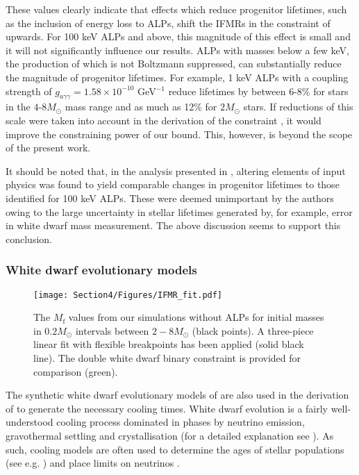 These values clearly indicate that effects which reduce progenitor lifetimes, such as the inclusion of energy loss to ALPs, shift the IFMRs in the constraint of \cite{Andrews} upwards. For 100 keV ALPs and above, this magnitude of this effect is small and it will not significantly influence our results. ALPs with masses below a few keV, the production of which is not Boltzmann suppressed, can substantially reduce the magnitude of progenitor lifetimes. For example, 1 keV ALPs with a coupling strength of $g_{a\gamma\gamma}=1.58\times10^{-10}$ GeV$^{-1}$ reduce lifetimes by between 6-8\% for stars in the $4$-$8M_{\odot}$ mass range and as much as 12\% for $2M_{\odot}$ stars. If reductions of this scale were taken into account in the derivation of the constraint \cite{Andrews}, it would improve the constraining power of our bound. This, however, is beyond the scope of the present work.


It should be noted that, in the analysis presented in \cite{Andrews}, altering elements of input physics was found to yield comparable changes in progenitor lifetimes to those identified for 100 keV ALPs. These were deemed unimportant by the authors owing to the large uncertainty in stellar lifetimes generated by, for example, error in white dwarf mass measurement. The above discussion seems to support this conclusion.


\subsubsection*{White dwarf evolutionary models}
\begin{figure}[t]
    \centering
    \texttt{[image: Section4/Figures/IFMR\_fit.pdf]}
    \caption{The $M_{\mathrm{f}}$ values from our simulations without ALPs for initial masses in $0.2M_{\odot}$ intervals between $2-8M_{\odot}$ (black points).  A three-piece linear fit with flexible breakpoints has been applied (solid black line). The double white dwarf binary constraint \cite{Andrews} is provided for comparison (green).}
    \label{fig: IFMR fit}
\end{figure}


The synthetic white dwarf evolutionary models of \cite{2001PASP..113..409F} are also used in the derivation of \cite{Andrews} to generate the necessary cooling times. White dwarf evolution is a fairly well-understood cooling process dominated in phases by neutrino emission, gravothermal settling and crystallisation (for a detailed explanation see \cite{2001PASP..113..409F, Tremblay2019}). As such, cooling models are often used to determine the ages of stellar populations (see e.g. \cite{Bedin}) and place limits on neutrinos \cite{Wignet2004ApJ, Hansen_2015}. 


